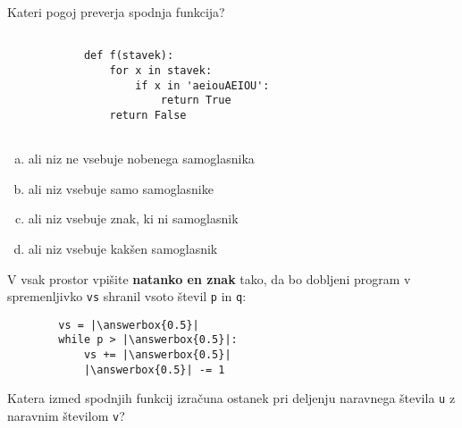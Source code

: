 \documentclass[arhiv, 10pt]{../izpit}
\newcommand{\inlinepy}[1]{\texttt{#1}}
\newcommand{\answerbox}[1]{\framebox{\vphantom{\large M}\hspace{#1cm}}}
\begin{document}
        \naloga*

        \begin{multicols}{2}
        \noindent
        Kateri pogoj preverja spodnja funkcija?
        \begin{verbatim}
        
            def f(stavek):
                for x in stavek:
                    if x in 'aeiouAEIOU':
                        return True
                return False
            
        \end{verbatim}

        \begin{enumerate}[(a)]
\item ali niz ne vsebuje nobenega samoglasnika
\item ali niz vsebuje samo samoglasnike
\item ali niz vsebuje znak, ki ni samoglasnik
\item ali niz vsebuje kakšen samoglasnik
\end{enumerate}

        \end{multicols}
    
        \naloga*
        \begin{multicols}{2}
        \noindent
        V vsak prostor vpišite \textbf{natanko en znak} tako, da bo dobljeni program v spremenljivko \inlinepy{vs} shranil vsoto števil \inlinepy{p} in \inlinepy{q}:
        
        \columnbreak
        \begin{verbatim}
        vs = |\answerbox{0.5}|
        while p > |\answerbox{0.5}|:
            vs += |\answerbox{0.5}|
            |\answerbox{0.5}| -= 1
        \end{verbatim}
        \end{multicols}
    
        \clearpage
        \naloga
        
        Katera izmed spodnjih funkcij izračuna ostanek pri deljenju naravnega števila \inlinepy{u} z naravnim številom \inlinepy{v}?
    
\end{document}
